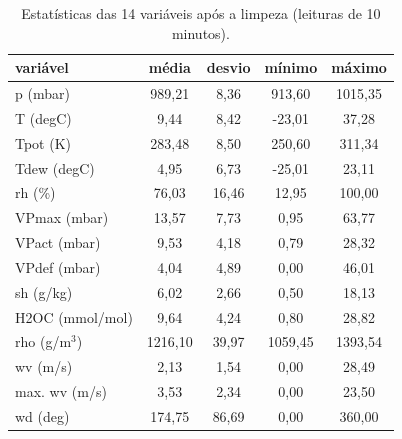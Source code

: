 \begin{table}[!t]
\centering
\caption{Estatísticas das 14 variáveis após a limpeza (leituras de 10 minutos).}
\label{tab:estatisticas}
\begin{tabular}{lcccc}
\hline
variável & média & desvio & mínimo & máximo \\
\hline
p (mbar) & 989,21 & 8,36 & 913,60 & 1015,35 \\
T (degC) & 9,44 & 8,42 & -23,01 & 37,28 \\
Tpot (K) & 283,48 & 8,50 & 250,60 & 311,34 \\
Tdew (degC) & 4,95 & 6,73 & -25,01 & 23,11 \\
rh (\%) & 76,03 & 16,46 & 12,95 & 100,00 \\
VPmax (mbar) & 13,57 & 7,73 & 0,95 & 63,77 \\
VPact (mbar) & 9,53 & 4,18 & 0,79 & 28,32 \\
VPdef (mbar) & 4,04 & 4,89 & 0,00 & 46,01 \\
sh (g/kg) & 6,02 & 2,66 & 0,50 & 18,13 \\
H2OC (mmol/mol) & 9,64 & 4,24 & 0,80 & 28,82 \\
rho (g/m$^3$) & 1216,10 & 39,97 & 1059,45 & 1393,54 \\
wv (m/s) & 2,13 & 1,54 & 0,00 & 28,49 \\
max. wv (m/s) & 3,53 & 2,34 & 0,00 & 23,50 \\
wd (deg) & 174,75 & 86,69 & 0,00 & 360,00 \\
\hline
\end{tabular}
\end{table}